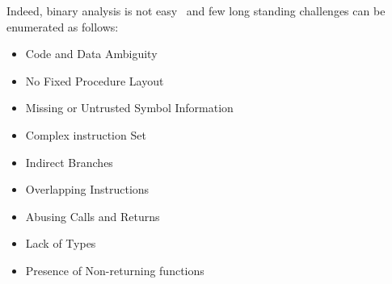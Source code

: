 Indeed, binary analysis is not easy~\cite{Meng:2016} and few long standing
challenges can be enumerated as follows:
\begin{itemize}
    \item Code and Data Ambiguity
    \item No Fixed Procedure Layout
    \item Missing or Untrusted Symbol Information
    \item Complex instruction Set
    \item Indirect Branches
    \item Overlapping Instructions
    \item Abusing Calls and Returns
    \item Lack of Types
    \item Presence of Non-returning functions
\end{itemize}   

